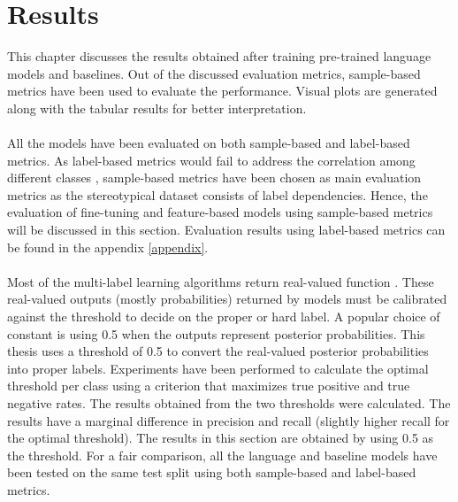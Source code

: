 \chapter{Results}

This chapter discusses the results obtained after training pre-trained language models and baselines. Out of the discussed evaluation metrics, sample-based metrics have been used to evaluate the performance. Visual plots are generated along with the tabular results for better interpretation. 
\\
\\
All the models have been evaluated on both sample-based and label-based metrics. As label-based metrics would fail to address the correlation among different classes \cite{zhang2010multi}, sample-based metrics have been chosen as main evaluation metrics as the stereotypical dataset consists of label dependencies. Hence, the evaluation of fine-tuning and feature-based models using sample-based metrics will be discussed in this section. Evaluation results using label-based metrics can be found in the appendix \ref{appendix}.
\\
\\
Most of the multi-label learning algorithms return real-valued function \cite{zhang2010multi}. These real-valued outputs (mostly probabilities) returned by models must be calibrated against the threshold to decide on the proper or hard label. A popular choice of constant is using 0.5 when the outputs represent posterior probabilities\cite{zhang2010multi}. This thesis uses a threshold of 0.5 to convert the real-valued posterior probabilities into proper labels. Experiments have been performed to calculate the optimal threshold per class using a criterion that maximizes true positive and true negative rates. The results obtained from the two thresholds were calculated. The results have a marginal difference in precision and recall (slightly higher recall for the optimal threshold). The results in this section are obtained by using 0.5 as the threshold. For a fair comparison, all the language and baseline models have been tested on the same test split using both sample-based and label-based metrics. 

